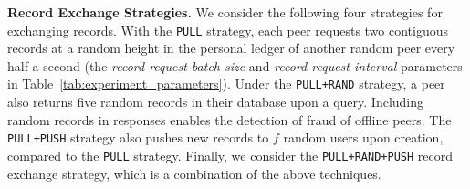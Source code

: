 \textbf{Record Exchange Strategies.}
We consider the following four strategies for exchanging records.
With the \texttt{PULL} strategy, each peer requests two contiguous records at a random height in the personal ledger of another random peer every half a second (the \emph{record request batch size} and \emph{record request interval} parameters in Table~\ref{tab:experiment_parameters}).
Under the \texttt{PULL+RAND} strategy, a peer also returns five random records in their database upon a query.
Including random records in responses enables the detection of fraud of offline peers.
The \texttt{PULL+PUSH} strategy also pushes new records to $ f $ random users upon creation, compared to the \texttt{PULL} strategy.
Finally, we consider the \texttt{PULL+RAND+PUSH} record exchange strategy, which is a combination of the above techniques.

